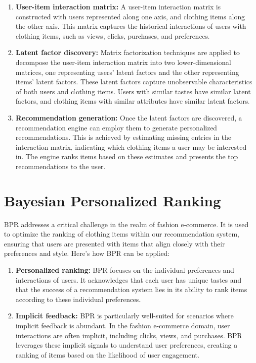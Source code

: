 	\begin{enumerate}
		\item \textbf{User-item interaction matrix:} A user-item interaction matrix is constructed with users represented along one axis, and clothing items along the other axis. This matrix captures the historical interactions of users with clothing items, such as views, clicks, purchases, and preferences.
		\item \textbf{Latent factor discovery:} Matrix factorization techniques are applied to decompose the user-item interaction matrix into two lower-dimensional matrices, one representing users' latent factors and the other representing items' latent factors. These latent factors capture unobservable characteristics of both users and clothing items. Users with similar tastes have similar latent factors, and clothing items with similar attributes have similar latent factors.
		\item \textbf{Recommendation generation:} Once the latent factors are discovered, a recommendation engine can employ them to generate personalized recommendations. This is achieved by estimating missing entries in the interaction matrix, indicating which clothing items a user may be interested in. The engine ranks items based on these estimates and presents the top recommendations to the user.
	\end{enumerate}

\section{Bayesian Personalized Ranking}
	BPR addresses a critical challenge in the realm of fashion e-commerce. It is used to optimize the ranking of clothing items within our recommendation system, ensuring that users are presented with items that align closely with their preferences and style. Here's how BPR can be applied:

	\begin{enumerate}
		\item \textbf{Personalized ranking:} BPR focuses on the individual preferences and interactions of users. It acknowledges that each user has unique tastes and that the success of a recommendation system lies in its ability to rank items according to these individual preferences.
		\item \textbf{Implicit feedback:} BPR is particularly well-suited for scenarios where implicit feedback is abundant. In the fashion e-commerce domain, user interactions are often implicit, including clicks, views, and purchases. BPR leverages these implicit signals to understand user preferences, creating a ranking of items based on the likelihood of user engagement.
	\end{enumerate}

